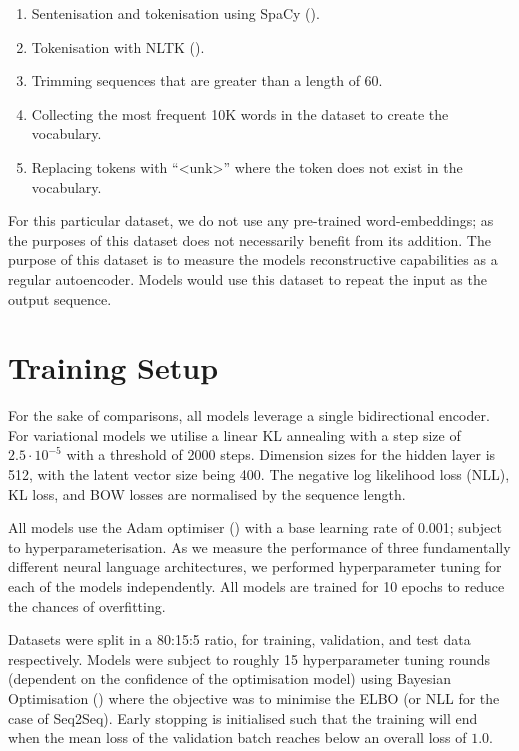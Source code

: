 \documentclass[12pt,twoside]{report}
\begin{document}
\begin{enumerate}  
	\item Sentenisation and tokenisation using SpaCy (\cite{honnibal_spacy_2017}).
	\item Tokenisation with NLTK (\cite{bird_natural_nodate}).
	\item Trimming sequences that are greater than a length of 60. 
	\item Collecting the most frequent 10K words in the dataset to create the vocabulary.
	\item Replacing tokens with ``\textless{}unk\textgreater'' where the token does not exist in the vocabulary.
\end{enumerate}

For this particular dataset, we do not use any pre-trained word-embeddings; as the purposes of this dataset does not necessarily benefit from its addition. The purpose of this dataset is to measure the models reconstructive capabilities as a regular autoencoder. Models would use this dataset to repeat the input as the output sequence.

\section{Training Setup}

For the sake of comparisons, all models leverage a single bidirectional encoder. For variational models we utilise a linear KL annealing with a step size of $2.5\cdot 10^{-5}$ with a threshold of 2000 steps. Dimension sizes for the hidden layer is 512, with the latent vector size  being 400. The negative log likelihood loss (NLL), KL loss, and BOW losses are normalised by the sequence length. 

All models use the Adam optimiser (\cite{kingma_adam:_2014}) with a base learning rate of 0.001; subject to hyperparameterisation. As we measure the performance of three fundamentally different neural language architectures, we performed hyperparameter tuning for each of the models independently. All models are trained for 10 epochs to reduce the chances of overfitting.

Datasets were split in a 80:15:5 ratio, for training, validation, and test data respectively. Models were subject to roughly 15 hyperparameter tuning rounds (dependent on the confidence of the optimisation model) using Bayesian Optimisation (\cite{gpyopt_authors_gpyopt:_2016}) where the objective was to minimise the ELBO (or NLL for the case of Seq2Seq). Early stopping is initialised such that the training will end when the mean loss of the validation batch reaches below an overall loss of $1.0$. 
\end{document}
